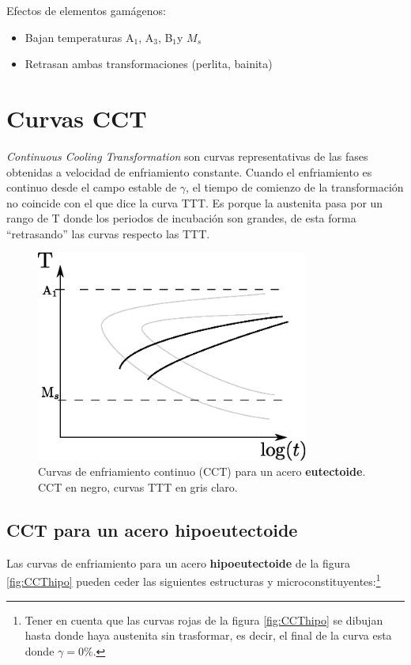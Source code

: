 \documentclass{article}
\newcommand{\Bs}{B\ensuremath{_{1}}}
\newcommand{\Aone}{A\ensuremath{_{1}}}
\newcommand{\Athree}{A\ensuremath{_{3}}}
\begin{document}
Efectos de elementos gamágenos:
\begin{itemize}
    \item Bajan temperaturas \Aone, \Athree, \Bs y $M_s$
    \item Retrasan ambas transformaciones (perlita, bainita)
\end{itemize}

\section{Curvas CCT}
\textit{Continuous Cooling Transformation} son curvas representativas de las fases obtenidas a velocidad de enfriamiento constante. Cuando el enfriamiento es continuo desde el campo estable de $\gamma$, el tiempo de comienzo de la transformación no coincide con el que dice la curva TTT. Es porque la austenita pasa por un rango de T donde los periodos de incubación son grandes, de esta forma ``retrasando'' las curvas respecto las TTT.

\begin{figure}[htb!]
    \centering
    \includegraphics[width=0.8\textwidth]{fig/CCTeutect.eps}
    \caption{Curvas de enfriamiento continuo (CCT) para un acero \textbf{eutectoide}. CCT en negro, curvas TTT en gris claro.}
    \label{fig:CCTeutect}
\end{figure}

\subsection{CCT para un acero hipoeutectoide}
Las curvas de enfriamiento para un acero \textbf{hipoeutectoide} de la figura \ref{fig:CCThipo} pueden ceder las siguientes estructuras y microconstituyentes:\footnote{Tener en cuenta que las curvas rojas de la figura \ref{fig:CCThipo} se dibujan hasta donde haya austenita sin trasformar, es decir, el final de la curva esta donde $\gamma=0\%$.}
\end{document}
